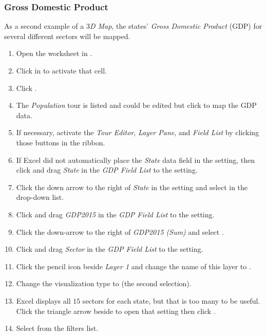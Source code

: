 \subsubsection{Gross Domestic Product}

As a second example of a \textit{$ 3 $D Map}, the states' \textit{Gross Domestic Product} (GDP) for several different sectors will be mapped.

\begin{enumerate}
	\item Open the  worksheet in .
	\item Click in  to activate that cell.
	\item Click .
	\item The \textit{Population} tour is listed and could be edited but click  to map the GDP data.
	\item If necessary, activate the \textit{Tour Editor}, \textit{Layer Pane}, and \textit{Field List} by clicking those buttons in the ribbon.
	\item If Excel did not automatically place the \textit{State} data field in the  setting, then click and drag \textit{State} in the \textit{GDP Field List} to the  setting. 
	\item Click the down arrow to the right of \textit{State} in the  setting and select  in the drop-down list.
	\item Click and drag \textit{GDP2015} in the \textit{GDP Field List} to the  setting.
	\item Click the down-arrow to the right of \textit{GDP2015 (Sum)} and select .
	\item Click and drag \textit{Sector} in the \textit{GDP Field List} to the  setting.
	\item Click the pencil icon beside \textit{Layer 1} and change the name of this layer to .
	\item Change the visualization type to  (the second selection).
	\item Excel displays all $ 15 $ sectors for each state, but that is too many to be useful. Click the triangle arrow beside  to open that setting then click .
	\item Select  from the filters list.

\end{enumerate}
